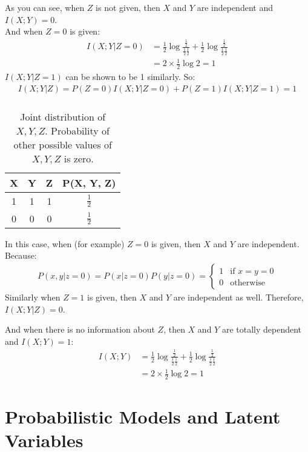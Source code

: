 \documentclass{article}
\begin{document}
As you can see, when \(Z\) is not given, then \(X\) and \(Y\) are independent and \(I(X; Y) = 0\).\\
And when \(Z=0\) is given:
\begin{align*}
I(X; Y|Z=0) &= \frac{1}{2} \log \frac{\frac{1}{2}}{\frac{1}{2} \frac{1}{2}} + \frac{1}{2} \log \frac{\frac{1}{2}}{\frac{1}{2} \frac{1}{2}}\\
&= 2 \times \frac{1}{2} \log 2 = 1
\end{align*}
\(I(X;Y|Z=1)\) can be shown to be 1 similarly. So:
\begin{align*}
I(X; Y|Z) = P(Z=0) I(X; Y|Z=0) + P(Z=1) I(X; Y|Z=1) = 1
\end{align*}

\subsubsection{}
\begin{table}[H]
\centering
\begin{tabular}{c|c|c|c}
X & Y & Z & P(X, Y, Z)\\
\hline
1 & 1 & 1 & \(\frac{1}{2}\)\\   
0 & 0 & 0 & \(\frac{1}{2}\)
\end{tabular}
\caption{Joint distribution of \(X, Y, Z\). Probability of other possible values of \(X, Y, Z\) is zero.}
\end{table}

In this case, when (for example) \(Z=0\) is given, then \(X\) and \(Y\) are independent. Because:
\begin{align*}
P(x, y|z=0) = P(x|z=0)P(y|z=0) =
\begin{cases}
1 & \text{if } x=y=0\\    
0 & \text{otherwise}
\end{cases}
\end{align*}
Similarly when \(Z=1\) is given, then \(X\) and \(Y\) are independent as well.
Therefore, \(I(X; Y|Z) = 0\).

And when there is no information about \(Z\), then \(X\) and \(Y\) are totally dependent and \(I(X; Y) = 1\):
\begin{align*}
I(X;Y) &= \frac{1}{2} \log \frac{\frac{1}{2}}{\frac{1}{2} \frac{1}{2}} + \frac{1}{2} \log \frac{\frac{1}{2}}{\frac{1}{2} \frac{1}{2}}\\
&= 2 \times \frac{1}{2} \log 2 = 1
\end{align*}

\section{Probabilistic Models and Latent Variables}
\end{document}
